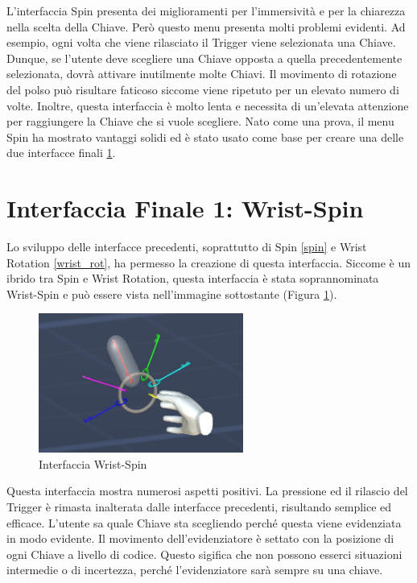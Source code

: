 \documentclass[target=bach,aauheader=]{thud}
\begin{document}
L'interfaccia Spin presenta dei miglioramenti per l'immersività e per la chiarezza nella scelta della Chiave.
Però questo menu presenta molti problemi evidenti.
Ad esempio, ogni volta che viene rilasciato il Trigger viene selezionata una Chiave.
Dunque, se l'utente deve scegliere una Chiave opposta a quella precedentemente selezionata, dovrà attivare inutilmente molte Chiavi. 
Il movimento di rotazione del polso può risultare faticoso siccome viene ripetuto per un elevato numero di volte.
Inoltre, questa interfaccia è molto lenta e necessita di un'elevata attenzione per raggiungere la Chiave che si vuole scegliere.
Nato come una prova, il menu Spin ha mostrato vantaggi solidi ed è stato usato come base per creare una delle due interfacce finali \ref{int_wrist-spin}.  

\section{Interfaccia Finale 1: Wrist-Spin} %
\label{int_wrist-spin}
Lo sviluppo delle interfacce precedenti, soprattutto di Spin \ref{spin} e Wrist Rotation \ref{wrist_rot}, ha permesso la creazione di questa interfaccia.
Siccome è un ibrido tra Spin e Wrist Rotation, questa interfaccia è stata soprannominata Wrist-Spin e può essere vista nell'immagine sottostante (Figura \ref{fig:wrist_spin}).

\begin{figure}[h]
    \centering
    \includegraphics[width=0.60\textwidth]{wrist_spin}
    \caption{Interfaccia Wrist-Spin}
    \label{fig:wrist_spin}
\end{figure}

Questa interfaccia mostra numerosi aspetti positivi.
La pressione ed il rilascio del Trigger è rimasta inalterata dalle interfacce precedenti, risultando semplice ed efficace.
L'utente sa quale Chiave sta scegliendo perché questa viene evidenziata in modo evidente.
Il movimento dell'evidenziatore è settato con la posizione di ogni Chiave a livello di codice. 
Questo sigifica che non possono esserci situazioni intermedie o di incertezza, perché l'evidenziatore sarà sempre su una chiave.
\end{document}
